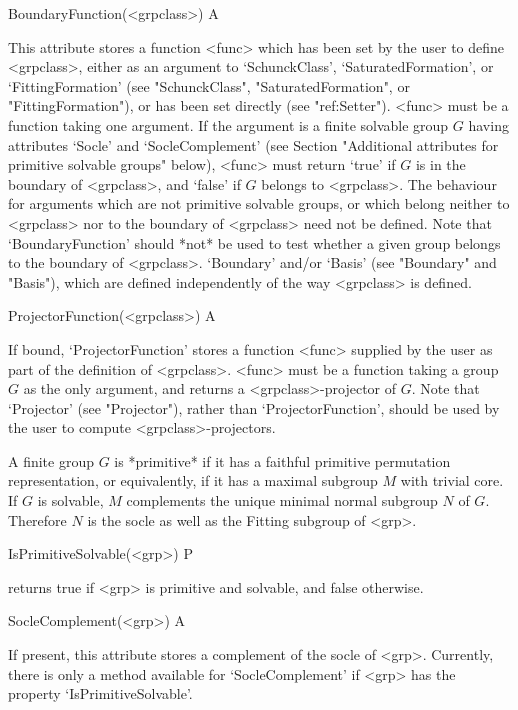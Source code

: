 \>BoundaryFunction(<grpclass>)                                  A

This attribute stores a function <func> which has been set by the 
user to define <grpclass>, either as an argument to `SchunckClass', 
`SaturatedFormation', or `FittingFormation' (see "SchunckClass", 
"SaturatedFormation", or "FittingFormation"), or has been set directly
(see "ref:Setter"). <func> must be a function taking one argument.
If the argument is a finite solvable group $G$ having attributes 
`Socle' and `SocleComplement' (see Section "Additional attributes for 
primitive solvable groups" below), <func> must  return `true' if $G$ 
is in the boundary of <grpclass>, and `false' if $G$ belongs to 
<grpclass>. The behaviour for arguments which are not primitive 
solvable groups, or which  belong neither to <grpclass> nor to the 
boundary of <grpclass> need not be defined. Note that 
`BoundaryFunction' should *not* be used to test whether a given group 
belongs to the boundary of <grpclass>. `Boundary' and/or `Basis' (see 
"Boundary" and "Basis"), which are defined independently of the way 
<grpclass> is defined.


\>ProjectorFunction(<grpclass>) A

If bound, `ProjectorFunction' stores a function <func> supplied by the
user as part of the definition of <grpclass>. <func> must be a function
taking a group
$G$ as the only argument, and returns a <grpclass>-projector of $G$.  Note that
`Projector' (see "Projector"),
rather than `ProjectorFunction', should be used by the user to compute
<grpclass>-projectors.


\null


A finite group $G$ is *primitive* if it has a faithful primitive permutation 
representation, or equivalently, if it has a maximal subgroup $M$ with trivial 
core. If $G$ is solvable, $M$ complements the unique minimal normal subgroup
$N$ of $G$. Therefore $N$ is the socle as well as the Fitting subgroup of
<grp>.


\>IsPrimitiveSolvable(<grp>) P

returns true if <grp> is primitive and solvable, and false otherwise.


\>SocleComplement(<grp>) A

If present, this attribute stores a complement of the socle of <grp>.
Currently, there is only a method available for `SocleComplement'
if <grp> has the property `IsPrimitiveSolvable'.


